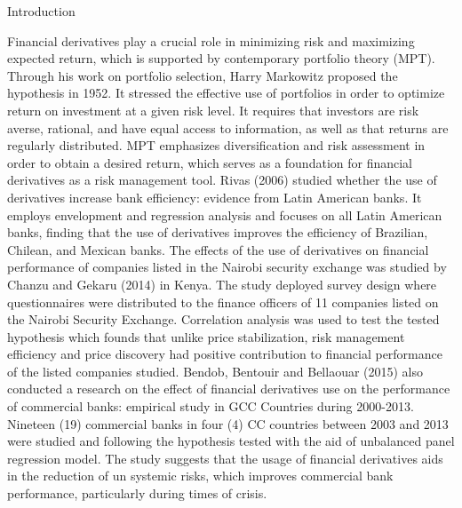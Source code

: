 \documentclass[unknownkeysallowed, compress]{beamer}
\theoremstyle{plain}
\begin{document}
\begin{frame}[allowframebreaks]{Introduction}
\par Financial derivatives play a crucial role in minimizing risk and maximizing expected
return, which is supported by contemporary portfolio theory (MPT).\\
Through his work on portfolio selection, Harry Markowitz proposed the hypothesis in
1952. It stressed the effective use of portfolios in order to optimize return on investment
at a given risk level. It requires that investors are risk averse, rational, and have equal
access to information, as well as that returns are regularly distributed. MPT emphasizes
diversification and risk assessment in order to obtain a desired return, which serves as a
foundation for financial derivatives as a risk management tool. Rivas (2006) studied
whether the use of derivatives increase bank efficiency: evidence from Latin American
banks. It employs envelopment and regression analysis and focuses on all Latin American
banks, finding that the use of derivatives improves the efficiency of Brazilian, Chilean, and
Mexican banks. The effects of the use of derivatives on financial performance of
companies listed in the Nairobi security exchange was studied by Chanzu and Gekaru
(2014) in Kenya. The study deployed survey design where questionnaires were
distributed to the finance officers of 11 companies listed on the Nairobi Security
Exchange. Correlation analysis was used to test the tested hypothesis which founds that
unlike price stabilization, risk management efficiency and price discovery had positive
contribution to financial performance of the listed companies studied.
Bendob, Bentouir and Bellaouar (2015) also conducted a research on the effect of
financial derivatives use on the performance of commercial banks: empirical study in GCC
Countries during 2000-2013. Nineteen (19) commercial banks in four (4) CC countries
between 2003 and 2013 were studied and following the hypothesis tested with the aid of
unbalanced panel regression model. The study suggests that the usage of financial
derivatives aids in the reduction of un systemic risks, which improves commercial bank
performance, particularly during times of crisis.\\


\end{frame}
\end{document}
